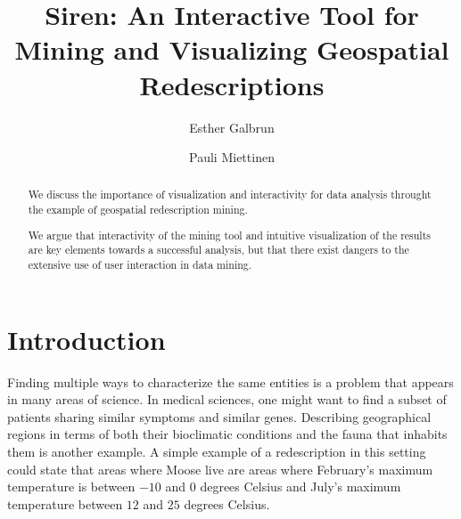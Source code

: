 \documentclass{llncs}
\renewcommand{\note}[1]{{\color{red}{#1}\par}}
\begin{document}
\title{Siren: An Interactive Tool for Mining and Visualizing Geospatial Redescriptions}

\author{
Esther Galbrun
\and
Pauli Miettinen
}

 
\maketitle
\begin{abstract}
  \note{being re-written} 
  We discuss the importance of visualization and
  interactivity for data analysis throught the example of geospatial redescription mining.


  We argue that interactivity of the mining tool and intuitive
  visualization of the results are key elements towards a successful
  analysis, but that there exist dangers to the extensive use of user
  interaction in data mining.
\end{abstract}

\section{Introduction}
\note{TODO: start visual and interactive data mining more generally?}

Finding multiple ways to characterize the same entities is a problem
that appears in many areas of science.  In medical sciences, one might
want to find a subset of patients sharing similar symptoms and similar
genes. Describing geographical regions in terms of both their
bioclimatic conditions and the fauna that inhabits them is another
example.  A simple example of a redescription in this setting could
state that areas where Moose live are areas where February's maximum
temperature is between $-10$ and $0$ degrees Celsius and July's
maximum temperature between $12$ and $25$ degrees Celsius.
\end{document}
